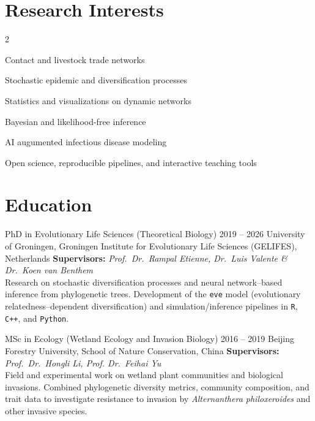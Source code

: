 \section*{Research Interests}

\begin{multicols}{2}
\begin{fancyitem}
  \item Contact and livestock trade networks
  \item Stochastic epidemic and diversification processes
  \item Statistics and visualizations on dynamic networks
  \item Bayesian and likelihood-free inference
  \item AI augumented infectious disease modeling
  \item Open science, reproducible pipelines, and interactive teaching tools
\end{fancyitem}
\end{multicols}

\section*{Education}

\cventry
  {PhD in Evolutionary Life Sciences (Theoretical Biology)}
  {2019 -- 2026}
  {University of Groningen, Groningen Institute for Evolutionary Life Sciences (GELIFES), Netherlands}
  {%
    \textbf{Supervisors:} \textit{Prof.\ Dr.\ Rampal Etienne, Dr.\ Luis Valente \& Dr.\ Koen van Benthem}\\[0.35em]
    Research on stochastic diversification processes and neural network--based inference from phylogenetic trees. Development of the \texttt{eve} model (evolutionary relatedness--dependent diversification) and simulation/inference pipelines in \texttt{R}, \texttt{C++}, and \texttt{Python}.
  }

\cventry
  {MSc in Ecology (Wetland Ecology and Invasion Biology)}
  {2016 -- 2019}
  {Beijing Forestry University, School of Nature Conservation, China}
  {%
    \textbf{Supervisors:} \textit{Prof.\ Dr.\ Hongli Li, Prof. Dr.\ Feihai Yu}\\[0.35em]
    Field and experimental work on wetland plant communities and biological invasions. Combined phylogenetic diversity metrics, community composition, and trait data to investigate resistance to invasion by \emph{Alternanthera philoxeroides} and other invasive species.
  }

